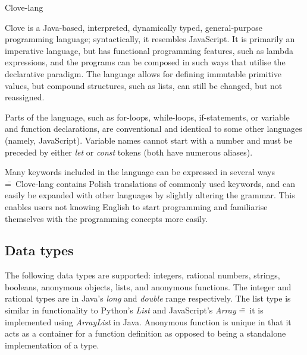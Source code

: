 \documentclass[12pt,a4paper]{article}
\begin{document}
\begin{center}
  \Huge {Clove-lang}
\end{center}

\noindent Clove is a Java-based, interpreted, dynamically typed, general-purpose programming language; syntactically, it resembles JavaScript. It is primarily an imperative language, but has functional programming features, such as lambda expressions, and the programs can be composed in such ways that utilise the declarative paradigm. The language allows for defining immutable primitive values, but compound structures, such as lists, can still be changed, but not reassigned.\par


Parts of the language, such as for-loops, while-loops, if-statements, or variable and function declarations, are conventional and identical to some other languages (namely, JavaScript). Variable names cannot start with a number and must be preceded by either \emph{let} or \emph{const} tokens (both have numerous aliases).\par

Many keywords included in the language can be expressed in several ways \==~Clove-lang contains Polish translations of commonly used keywords, and can easily be expanded with other languages by slightly altering the grammar. This enables users not knowing English to start programming and familiarise themselves with the programming concepts more easily.



\subsection*{Data types}


The following data types are supported: integers, rational numbers, strings, booleans, anonymous objects, lists, and anonymous functions. The integer and rational types are in Java's \emph{long} and \emph{double} range respectively. The list type is similar in functionality to Python's \emph{List} and JavaScript's \emph{Array} \==~it is implemented using \emph{ArrayList} in Java. Anonymous function is unique in that it acts as a container for a function definition as opposed to being a standalone implementation of a type.\par
\end{document}
